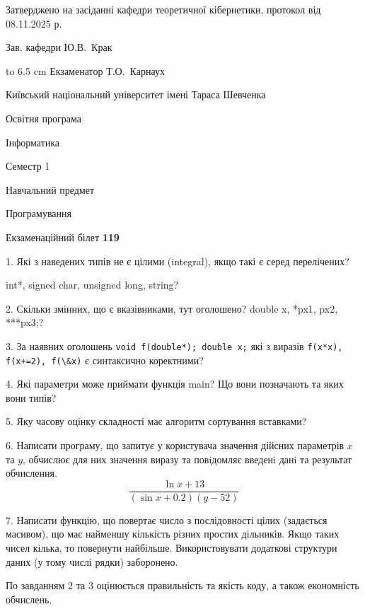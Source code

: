 \documentclass[12pt, ukrainian]{article}
\def\code#1{\Verb!#1!}
\begin{document}
{\smallskip\smallskip \begin {scriptsize} Затверджено на засіданні кафедри теоретичної кібернетики, протокол   від   08.11.2025 р.\par\smallskip\smallskip\smallskip\smallskip
{\parbox {6.5 cm} {Зав. кафедри \dotfill Ю.В.~Крак}}\hspace {0.7cm} {\hbox to 6.5 cm { Екзаменатор \dotfill Т.О.~Карнаух}} \end{scriptsize}}
\newpage
{{\begin {scriptsize}\par
{ \center  Київський національний університет імені Тараса Шевченка \par}
{\parbox {5 cm}{Освітня програма \hfill}{\parbox {7 cm}{Інформатика\hfill}}\parbox {6 cm}{\hfill Семестр 1}}\par
{\parbox {5 cm} {Навчальний предмет \hfill}\parbox {7 cm}{Програмування \hfill}\parbox {6cm}{\hfill}\par}\vspace{-15pt} \end{scriptsize}}{\center Екзаменаційний білет \No \textbf { 119 }\par}}
{%
1. Які з наведених типів не є цілими (integral), якщо такі є серед перелічених?

int*, signed char, unsigned long, string?
\par
\vspace{2mm}
2. Скільки змінних, що є вказівниками, тут оголошено?
double x, *px1, px2, ***px3;?
\par
\vspace{2mm}
3. За наявних оголошень \code{void f(double*); double x;} які з виразів \code{f(x*x), f(x+=2), f(\&x)} є синтаксично коректними?
\par
\vspace{2mm}
4. Які параметри може приймати функція main? Що вони позначають та яких вони типів?
\par
\vspace{2mm}
5. Яку часову оцінку складності має алгоритм сортування вставками?
\par
\vspace{2mm}
6. Написати програму, що запитує у користувача значення дійсних параметрів $x$ та $y$, обчислює для них значення виразу та повiдомляє введенi данi та результат обчислення.
$$\frac{\ln x + 13}{(\sin x + 0.2) (y - 52)}$$ 

\par
7. Написати функцію, що повертає число з послідовності цілих (задається масивом), що має найменшу кількість різних простих дільників. Якщо таких чисел кілька, то повернути найбільше. Використовувати додаткові структури даних (у тому числі рядки) заборонено.

По завданням 2 та 3 оцінюється правильність та якість коду, а також економність обчислень.

}
\end{document}
